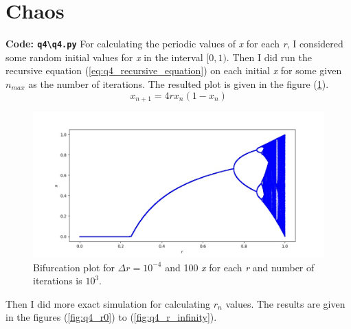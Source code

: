 \documentclass[12pt, a4paper]{article}
\begin{document}
	\section{Chaos}
	\textbf{Code: \texttt{q4\textbackslash q4.py}}
	\newline
	For calculating the periodic values of \textit{x} for each \textit{r}, I considered some random
	initial values for \textit{x} in the interval
	$[0, 1)$.
	Then I did run the recursive equation (\ref{eq:q4_recursive_equation}) on each initial \textit{x} for some given \texttt{$n_{max}$} as the number of iterations. The resulted
	plot is given in the figure (\ref{fig:q4_landscape}).
		\begin{equation}
			x_{n+1} = 4rx_{n}(1-x_{n})
			\label{eq:q4_recursive_equation}
		\end{equation}
		\begin{figure}[h]
			\centering
			\includegraphics[width=0.8\linewidth]{../q4/q4_0_1_10000_100_1000.jpg}
			\caption{Bifurcation plot for $\Delta r=10^{-4}$ and 100 \textit{x} for each 
				\textit{r} and number of iterations is $10^3$.}
			\label{fig:q4_landscape}
		\end{figure}
	Then I did more exact simulation for calculating $r_n$ values. The results are given
	in the figures (\ref{fig:q4_r0}) to (\ref{fig:q4_r_infinity}).
\end{document}
